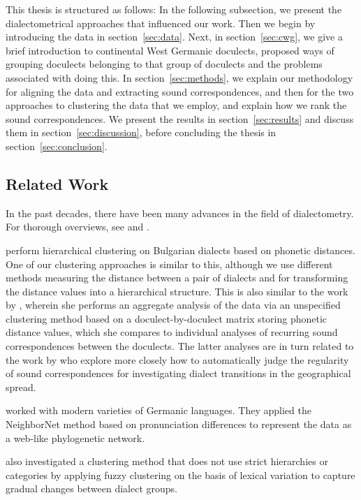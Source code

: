 \documentclass[a4paper]{article}
\begin{document}
This thesis is structured as follows:
In the following subsection, we present the
dialectometrical approaches that influenced our work.
Then we begin by introducing the data in section~\ref{sec:data}.
Next, in section~\ref{sec:cwg},
we give a brief introduction to continental West Germanic doculects,
proposed ways of grouping doculects belonging to that group of doculects
and the problems associated with doing this.
In section~\ref{sec:methods}, we explain our methodology for
aligning the data and extracting sound correspondences,
and then for the two approaches to clustering the data that we employ,
and explain how we rank the sound correspondences.
We present the results in section~\ref{sec:results}
and discuss them in section~\ref{sec:discussion},
before concluding the thesis in section~\ref{sec:conclusion}.

\subsection{Related Work}

In the past decades, there have been many advances in the field of dialectometry.
For thorough overviews, see \citet{nerbonne2009data} and \citet{wieling2015advances}.

\citet{prokic2012detecting} perform hierarchical clustering
on Bulgarian dialects based on phonetic distances.
One of our clustering approaches is similar to this,
although we use different methods measuring the distance between a pair of dialects
and for transforming the distance values into a hierarchical structure.
This is also similar to the work by \citet{prokic2007identifying},
wherein she performs an aggregate analysis of the
data via an unspecified clustering method based on a
doculect-by-doculect matrix storing phonetic distance values,
which she compares to individual analyses of recurring sound correspondences
between the doculects.
The latter analyses are in turn related to the work by
\citet{prokic2013combining} who explore more closely how
to automatically judge the regularity of sound correspondences
for investigating dialect transitions in the geographical spread.

\citet{heggarty2010splits} worked with modern varieties of Germanic languages.
They applied the NeighborNet method \citep{bryant2004neighbornet}
based on pronunciation differences to represent the data as a
web-like phylogenetic network.

\citet{proell2013detecting} also investigated a clustering method
that does not use strict hierarchies or categories by
applying fuzzy clustering on the basis of lexical variation
to capture gradual changes between dialect groups.
\end{document}
